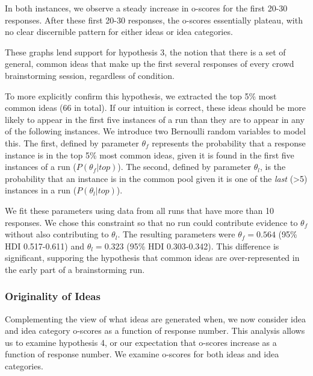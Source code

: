 In both instances, we observe a steady increase in o-scores for the first 20-30 responses. After these first 20-30 responses, the o-scores essentially plateau, with no clear discernible pattern for either ideas or idea categories.

These graphs lend support for hypothesis 3, the notion that there is a set of general, common ideas that make up the first several responses of every crowd brainstorming session, regardless of condition.

To more explicitly confirm this hypothesis, we extracted the top 5\% most common ideas (66 in total). If our intuition is correct, these ideas should be more likely to appear in the first five instances of a run than they are to appear in any of the following instances. We introduce two Bernoulli random variables to model this. The first, defined by parameter $\theta_f$ represents the probability that a response instance is in the top 5\% most common ideas, given it is found in the first five instances of a run ($P(\theta_f|top)$). The second, defined by parameter $\theta_l$, is the probability that an instance is in the common pool given it is one of the \emph{last} (>5) instances in a run ($P(\theta_l|top)$).

We fit these parameters using data from all runs that have more than 10 responses. We chose this constraint so that no run could contribute evidence to $\theta_f$ without also contributing to $\theta_l$. The resulting parameters were $\theta_f = 0.564$ (95\% HDI 0.517-0.611) and $\theta_l = 0.323$ (95\% HDI 0.303-0.342). This difference is significant, supporing the hypothesis that common ideas are over-represented in the early part of a brainstorming run.



\subsubsection{Originality of Ideas}
Complementing the view of what ideas are generated when, we now consider idea and idea category o-scores as a function of response number. This analysis allows us to examine hypothesis 4, or our expectation that o-scores increase as a function of response number. We examine o-scores for both ideas and idea categories.




